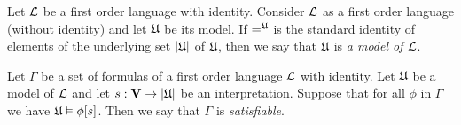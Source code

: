 \documentclass[10pt]{amsart}
\begin{document}
\begin{definition}
	Let ${\mathcal L}$ be a first order language with identity. Consider ${\mathcal L}$ as a first order language (without identity) and let ${\mathfrak U}$ be its model. If $=^{\mathfrak U}$ is the standard identity of elements of the underlying set $|{\mathfrak U}|$ of ${\mathfrak U}$, then we say that ${\mathfrak U}$ is \textit{a model of ${\mathcal L}$}.
\end{definition}

\begin{definition}
	Let $\Gamma$ be a set of formulas of a first order language ${\mathcal L}$ with identity. Let ${\mathfrak U}$ be a model of ${\mathcal L}$ and let $s: \mathbf{V} \rightarrow |{\mathfrak U}|$ be an interpretation. Suppose that for all $\phi$ in $\Gamma$ we have ${\mathfrak U} \vDash \phi[s]$. Then we say that $\Gamma$ is \textit{satisfiable}.
\end{definition}
\end{document}
